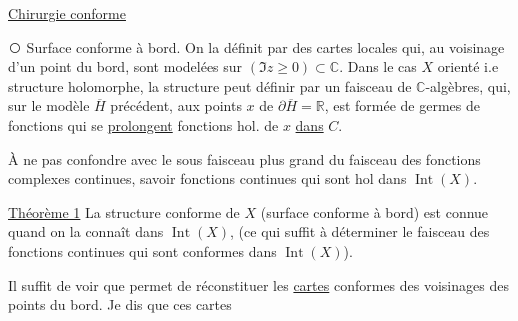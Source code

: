
\uline{}

\uline{Chirurgie conforme}

\textcircled{} Surface conforme à bord. On  la définit par des cartes locales qui, au voisinage d'un point du bord, sont modelées sur  $(\Im z\geq 0)\subset\mathbb C$. Dans le cas $X$ orienté i.e structure holomorphe, la structure peut  définir par un faisceau de $\mathbb C$-algèbres, qui, sur le modèle $\overline H$ précédent, aux points $x$ de $\partial\overline H=\mathbb R$, est formée de germes de fonctions qui se \uline{prolongent}  fonctions hol.   de $x$ \uline{dans} $C$.

À ne pas confondre avec le sous faisceau plus grand du faisceau des fonctions complexes continues, savoir   fonctions continues qui sont hol dans $\operatorname{Int}(X)$.

\uline{Théorème 1} La structure conforme de $X$ (surface conforme à bord) est connue quand on la connaît dans $\operatorname{Int}(X)$, (ce qui suffit à déterminer le faisceau des fonctions  continues qui sont conformes dans $\operatorname{Int}(X)$).

Il suffit de voir que  permet de réconstituer les \uline{cartes} conformes des voisinages des points du bord. Je dis que ces cartes
